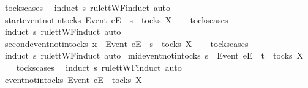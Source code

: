\isatagproof
{}\isamarkupfalse%
\ tocks{\isachardot}cases\ \isamarkupfalse%
\ {\isacharparenleft}induct\ s\ rule{\isacharcolon}ttWF{\isachardot}induct{\isacharcomma}\ auto{\isacharparenright}%
\endisatagproof
{\isafoldproof}%
%
\isadelimproof
\isanewline
%
\endisadelimproof
\isanewline
{}\isamarkupfalse%
\ start{\isacharunderscore}event{\isacharunderscore}notin{\isacharunderscore}tocks{\isacharcolon}\ {\isachardoublequoteopen}{\isacharbrackleft}Event\ e{\isacharbrackright}\isactrlsub E\ {\isacharhash}\ s\ {\isasymnotin}\ tocks\ X{\isachardoublequoteclose}\isanewline
%
\isadelimproof
\ \ %
\endisadelimproof
%
\isatagproof
{}\isamarkupfalse%
\ tocks{\isachardot}cases\ \isamarkupfalse%
\ {\isacharparenleft}induct\ s\ rule{\isacharcolon}ttWF{\isachardot}induct{\isacharcomma}\ auto{\isacharparenright}%
\endisatagproof
{\isafoldproof}%
%
\isadelimproof
\isanewline
%
\endisadelimproof
\isanewline
{}\isamarkupfalse%
\ second{\isacharunderscore}event{\isacharunderscore}notin{\isacharunderscore}tocks{\isacharcolon}\ {\isachardoublequoteopen}x\ {\isacharhash}\ {\isacharbrackleft}Event\ e{\isacharbrackright}\isactrlsub E\ {\isacharhash}\ s\ {\isasymnotin}\ tocks\ X{\isachardoublequoteclose}\isanewline
%
\isadelimproof
\ \ %
\endisadelimproof
%
\isatagproof
{}\isamarkupfalse%
\ tocks{\isachardot}cases\ \isamarkupfalse%
\ {\isacharparenleft}induct\ s\ rule{\isacharcolon}ttWF{\isachardot}induct{\isacharcomma}\ auto{\isacharparenright}%
\endisatagproof
{\isafoldproof}%
%
\isadelimproof
\isanewline
%
\endisadelimproof
\isanewline
{}\isamarkupfalse%
\ mid{\isacharunderscore}event{\isacharunderscore}notin{\isacharunderscore}tocks{\isacharcolon}\ {\isachardoublequoteopen}s\ {\isacharat}\ {\isacharbrackleft}{\isacharbrackleft}Event\ e{\isacharbrackright}\isactrlsub E{\isacharbrackright}\ {\isacharat}\ t\ {\isasymnotin}\ tocks\ X{\isachardoublequoteclose}\isanewline
%
\isadelimproof
\ \ %
\endisadelimproof
%
\isatagproof
{}\isamarkupfalse%
\ tocks{\isachardot}cases\ \isamarkupfalse%
\ {\isacharparenleft}induct\ s\ rule{\isacharcolon}ttWF{\isachardot}induct{\isacharcomma}\ auto{\isacharparenright}%
\endisatagproof
{\isafoldproof}%
%
\isadelimproof
\isanewline
%
\endisadelimproof
\isanewline
{}\isamarkupfalse%
\ event{\isacharunderscore}notin{\isacharunderscore}tocks{\isacharcolon}\ {\isachardoublequoteopen}{\isacharbrackleft}{\isacharbrackleft}Event\ e{\isacharbrackright}\isactrlsub E{\isacharbrackright}\ {\isasymnotin}\ tocks\ X{\isachardoublequoteclose}\isanewline
